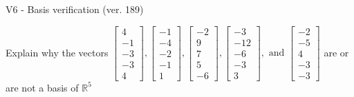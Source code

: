 \begin{exercise}
  \begin{exerciseTitle}V6 - Basis verification (ver. 189)\end{exerciseTitle}
  \begin{exerciseStatement}
    Explain why the vectors \(\left[\begin{array}{r}
4 \\
-1 \\
-3 \\
-3 \\
4
\end{array}\right] , \left[\begin{array}{r}
-1 \\
-4 \\
-2 \\
-1 \\
1
\end{array}\right] , \left[\begin{array}{r}
-2 \\
9 \\
7 \\
5 \\
-6
\end{array}\right] , \left[\begin{array}{r}
-3 \\
-12 \\
-6 \\
-3 \\
3
\end{array}\right] , \text{ and } \left[\begin{array}{r}
-2 \\
-5 \\
4 \\
-3 \\
-3
\end{array}\right]\) are or are not a basis of \(\mathbb{R}^5\)	



\end{exerciseStatement}
\end{exercise}
